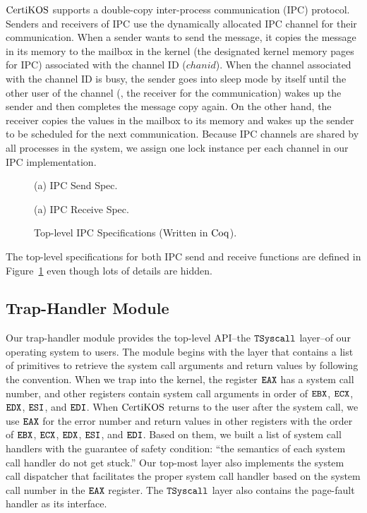 $\mathrm{CertiKOS}$ supports a double-copy inter-process communication (IPC) protocol.
Senders and receivers of IPC use the dynamically allocated IPC channel for their communication. 
When a sender wants to send the message, 
it copies the message in its memory to the mailbox in the kernel (the designated kernel memory pages for IPC) associated with the channel ID ($chanid$).
When the channel associated with the channel ID is busy, the sender goes into  sleep mode by itself until the other user of the channel
(\ie, the receiver for the communication) wakes up the sender and then completes the message copy again. 
On the other hand, the receiver copies the values in the mailbox to its memory and wakes up the sender to be scheduled for the next communication. 
Because IPC channels are shared by all processes in the system, 
we assign one lock instance per each channel in our IPC implementation.
 \begin{figure}
\begin{center}

(a) IPC Send Spec.
 
(a) IPC Receive Spec.
\end{center}
\caption{Top-level IPC Specifications (Written in $\mathrm{Coq}$).}
\label{fig:chapter:certikos:ipc-specs}
\end{figure}
The top-level specifications for both IPC send and receive functions are defined in Figure~\ref{fig:chapter:certikos:ipc-specs}
even though lots of details are hidden. 


\subsection{Trap-Handler Module}
\label{chapter:certikos:subsec:trap-handler-module}

Our trap-handler module provides the top-level API--the ${{\mathrm{\texttt{TSyscall}}}}$ layer--of our operating system to users.  
The module begins with the layer that contains a list of primitives to retrieve the system call arguments and return values
by following the convention.
When we trap into the kernel, the register ${\mathrm{\texttt{EAX}}}$ has a system call number, and other registers contain system call arguments in order of ${\mathrm{\texttt{EBX}}}$, ${\mathrm{\texttt{ECX}}}$, ${\mathrm{\texttt{EDX}}}$, ${\mathrm{\texttt{ESI}}}$, and ${\mathrm{\texttt{EDI}}}$. 
When $\mathrm{CertiKOS}$ returns to the user after the system call, we use ${\mathrm{\texttt{EAX}}}$ for the error number and 
return values in other registers with the order of 
 ${\mathrm{\texttt{EBX}}}$, ${\mathrm{\texttt{ECX}}}$, ${\mathrm{\texttt{EDX}}}$, ${\mathrm{\texttt{ESI}}}$, and ${\mathrm{\texttt{EDI}}}$. 
Based on them, 
we built a list of system call handlers with the guarantee of safety condition:
``the semantics of each system call handler do not get stuck.'' 
Our top-most layer also implements the system call dispatcher that facilitates the proper system call handler based on the system call number in the ${\mathrm{\texttt{EAX}}}$ register.
The ${{\mathrm{\texttt{TSyscall}}}}$ layer also contains the page-fault handler as its interface.

